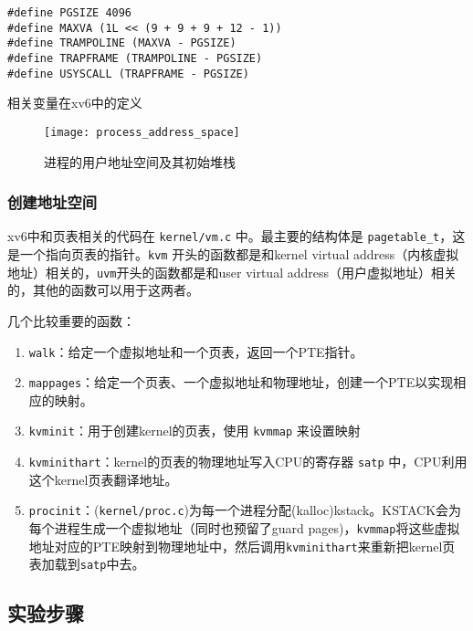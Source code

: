 {\begin{listing}[!htb]
	\begin{verbatim}
#define PGSIZE 4096
#define MAXVA (1L << (9 + 9 + 9 + 12 - 1))
#define TRAMPOLINE (MAXVA - PGSIZE)
#define TRAPFRAME (TRAMPOLINE - PGSIZE)
#define USYSCALL (TRAPFRAME - PGSIZE)
	\end{verbatim}
	\caption{相关变量在xv6中的定义}\label{lst:relevant_variables}
\end{listing}

\begin{figure}[!htb]
	\centering
	\texttt{[image: process\_address\_space]}
	\caption{进程的用户地址空间及其初始堆栈}
	\label{fig:process_address_space}
\end{figure}

\subsubsection{创建地址空间}

xv6中和页表相关的代码在 \texttt{kernel/vm.c} 中。最主要的结构体是 \texttt{pagetable\_t}，这是一个指向页表的指针。\texttt{kvm} 开头的函数都是和kernel virtual address（内核虚拟地址）相关的，\texttt{uvm}开头的函数都是和user virtual address（用户虚拟地址）相关的，其他的函数可以用于这两者。

几个比较重要的函数：
\begin{enumerate}
	\item \texttt{walk}：给定一个虚拟地址和一个页表，返回一个PTE指针。
	\item \texttt{mappages}：给定一个页表、一个虚拟地址和物理地址，创建一个PTE以实现相应的映射。
	\item \texttt{kvminit}：用于创建kernel的页表，使用 \texttt{kvmmap} 来设置映射
	\item \texttt{kvminithart}：kernel的页表的物理地址写入CPU的寄存器 \texttt{satp} 中，CPU利用这个kernel页表翻译地址。
	\item \texttt{procinit}：(\texttt{kernel/proc.c})为每一个进程分配(kalloc)kstack。KSTACK会为每个进程生成一个虚拟地址（同时也预留了guard pages)，\texttt{kvmmap}将这些虚拟地址对应的PTE映射到物理地址中，然后调用\texttt{kvminithart}来重新把kernel页表加载到\texttt{satp}中去。
\end{enumerate}

\subsection{实验步骤}

}
